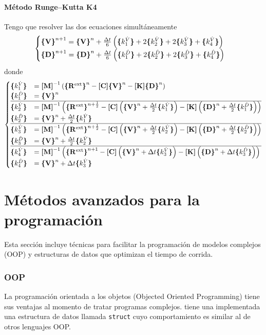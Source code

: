 \subsection*{Método Runge--Kutta K4}
Tengo que resolver las dos ecuaciones simultáneamente
\[
\begin{cases}
	\Cme{V}^{n+1}=\Cme{V}^n + \frac{\Delta t}{6} \left( \kuV + 2\kdV + 2\ktV + \kcV \right) \\
	\Cme{D}^{n+1}=\Cme{D}^n + \frac{\Delta t}{6} \left( \kuD + 2\kdD + 2\ktD + \kcD \right) \\
\end{cases}
\]
donde 
\begin{align*}
	\begin{cases}
	\kuV &= \Mme{M}^{-1} \left( \Cme{R^{\mathrm{ext}}}^n - \MC \Cme{V}^n - \MK \Cme{D}^n  \right) \\
	\kuD &= \Cme{V}^n \\\hline
	\kdV &= \Mme{M}^{-1} \left( \Cme{R^{\mathrm{ext}}}^{n+\frac{1}{2}} - \MC \left(\Cme{V}^n + \frac{\Delta t}{2} \kuV \right) - \MK \left( \Cme{D}^n + \frac{\Delta t}{2} \kuD \right)  \right) \\
	\kdD &= \Cme{V}^n + \frac{\Delta t}{2} \kuV \\	\hline
	\ktV &= \Mme{M}^{-1} \left( \Cme{R^{\mathrm{ext}}}^{n+\frac{1}{2}} - \MC \left(\Cme{V}^n + \frac{\Delta t}{2} \kdV \right) - \MK \left( \Cme{D}^n + \frac{\Delta t}{2} \kdD \right)  \right) \\
	\ktD &= \Cme{V}^n + \frac{\Delta t}{2} \kdV \\	\hline
	\kcV &= \Mme{M}^{-1} \left( \Cme{R^{\mathrm{ext}}}^{n+1} - \MC \left(\Cme{V}^n + \Delta t \ktV \right) - \MK \left( \Cme{D}^n + \Delta t \ktD \right)  \right) \\
	\kcD &= \Cme{V}^n + \Delta t \ktV
	\end{cases}
\end{align*}

\part{Métodos avanzados para la programación}
Esta sección incluye técnicas para facilitar la programación de modelos complejos (OOP) y estructuras de datos que optimizan el tiempo de corrida.

\section{OOP}
La programación orientada a los objetos (Objected Oriented Programming) tiene sus ventajas al momento de tratar programas complejos. \Matlab{} tiene una implementada una estructura de datos llamada \verb|struct| cuyo comportamiento es similar al de otros lenguajes OOP. 

